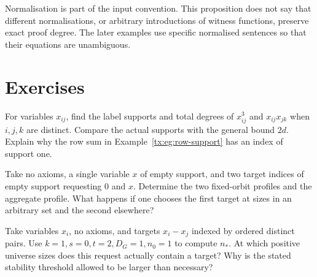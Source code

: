 Normalisation is part of the input convention. This proposition does
not say that different normalisations, or arbitrary introductions of
witness functions, preserve exact proof degree. The later examples use
specific normalised sentences so that their equations are unambiguous.

\section{Exercises}
\begin{exercise}\label{tx:ex:support-count}
For variables $x_{ij}$, find the label supports and total degrees of
$x_{ij}^3$ and $x_{ij}x_{jk}$ when $i,j,k$ are distinct. Compare the
actual supports with the general bound $2d$. Explain why the row sum
in Example~\ref{tx:eg:row-support} has an index of support one.
\end{exercise}
\par\medskip

\begin{exercise}\label{tx:ex:orbit-switch}
Take no axioms, a single variable $x$ of empty support, and two target
indices of empty support requesting $0$ and $x$. Determine the two
fixed-orbit profiles and the aggregate profile. What happens if one
chooses the first target at sizes in an arbitrary set and the second
elsewhere?
\end{exercise}
\par\medskip

\begin{exercise}\label{tx:ex:stable-floor}
Take variables $x_i$, no axioms, and targets $x_i-x_j$ indexed by
ordered distinct pairs. Use $k=1,s=0,t=2,D_G=1,n_0=1$ to compute $n_*$.
At which positive universe sizes does this request actually contain a target?
Why is the stated stability threshold allowed to be larger than necessary?
\end{exercise}
\par\medskip

